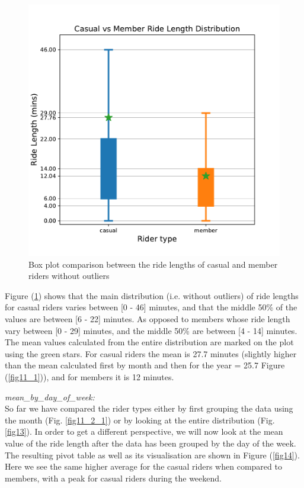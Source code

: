 \documentclass[12pt]{article}
\begin{document}
	\begin{figure}[h]
	\centering
	\includegraphics[scale=0.5]{boxplot_distribution2.pdf} 
	\caption{Box plot comparison between the ride lengths of casual and member riders without outliers}
	\label{fig15}
	\end{figure}

Figure (\ref{fig15}) shows that the main distribution (i.e. without outliers) of ride lengths for casual riders varies between [0 - 46] minutes, and that the middle 50\% of the values are between [6 - 22] minutes. As opposed to members whose ride length vary between [0 - 29] minutes, and the middle 50\% are between [4 - 14] minutes. The mean values calculated from the entire distribution are marked on the plot using the green stars. For casual riders the mean is 27.7 minutes (slightly higher than the mean calculated first by month and then for the year = 25.7 Figure (\ref{fig11_1})), and for members it is 12 minutes.  
	
\textit{mean\_by\_day\_of\_week:}\\
	So far we have compared the rider types either by first grouping the data using the month (Fig. \ref{fig11_2_1}) or by looking at the entire distribution (Fig. \ref{fig13}). In order to get a different perspective, we will now look at the mean value of the ride length after the data has been grouped by the day of the week. The resulting pivot table as well as its visualisation are shown in Figure (\ref{fig14}). Here we see the same higher average for the casual riders when compared to members, with a peak for casual riders during the weekend. 
	
\end{document}
